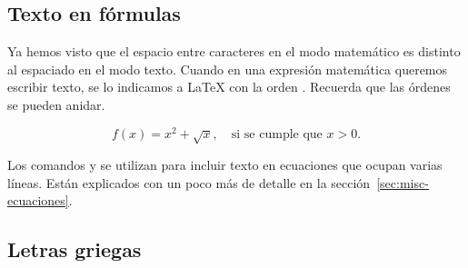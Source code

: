 \documentclass{article}
\numberwithin{equation}{section}
\theoremstyle{plain}
\theoremstyle{definition}
\theoremstyle{remark}
\begin{document}
%
%
%

\subsection{Texto en fórmulas}


Ya hemos visto que el espacio entre caracteres en el modo matemático es distinto al espaciado en el modo texto. Cuando en una expresión matemática queremos escribir texto, se lo indicamos a \LaTeX{} con la orden \texttt{}. Recuerda que las órdenes se pueden anidar.
\begin{codigo-arriba}
	\[ 
	f(x)=x^2 + \sqrt{x}, \quad \text{si se cumple que $x>0$.}
	\]
\end{codigo-arriba}
Los comandos \texttt{} y \texttt{} se utilizan para incluir texto en ecuaciones que ocupan varias líneas. Están explicados con un poco más de detalle en la sección~\ref{sec:misc-ecuaciones}.

\subsection*{Letras griegas}    
\end{document}
